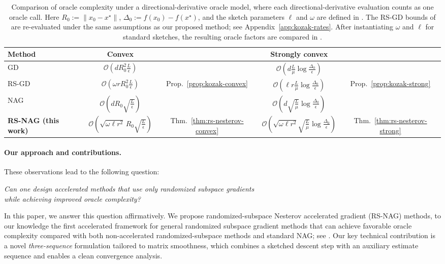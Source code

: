\documentclass[10pt]{article}
\begin{document}
 \begin{table}[t]
\centering
\caption{Comparison of oracle complexity under a directional-derivative oracle model, 
  where each directional-derivative evaluation counts as one oracle call. 
  Here \(R_0:=\|x_0-x^\star\|\), \(\Delta_0:=f(x_0)-f(x^\star)\), and the sketch parameters \(\ell\) and \(\omega\) are defined in . The RS-GD bounds of \cite{kozak2021} are re-evaluated under the same assumptions as our proposed method; see Appendix~\ref{app:kozak-rates}. After instantiating \(\omega\) and \(\ell\) for standard sketches, the resulting
oracle factors are compared in .}
\label{tab:oracle-comparison-intro}
{
\setlength{\tabcolsep}{4pt}
\renewcommand{\arraystretch}{1.1}
\begin{tabular}{@{}l|cc|cc@{}}
\toprule
Method & Convex & & Strongly convex & \\
\midrule
GD
&
\(\mathcal{O}\!\left(d R_0^2 \frac{L}{\epsilon}\right)\)
& 
&
\(\mathcal{O}\!\left(d \frac{L}{\mu}\log\frac{\Delta_0}{\epsilon}\right)\)
& 
\\
RS-GD \cite{kozak2021}
&
\(\mathcal{O}\!\left(\omega r R_0^2 \frac{L}{\epsilon}\right)\)
& Prop.~\ref{prop:kozak-convex}
&
\(\mathcal{O}\!\left(\ell r \frac{L}{\mu}\log\frac{\Delta_0}{\epsilon}\right)\)
& Prop.~\ref{prop:kozak-strong}
\\
\midrule
NAG \cite{nesterov1983,nesterov2004intro}
&
\(\mathcal{O}\!\left(d R_0 \sqrt{\frac{L}{\epsilon}}\right)\)
& 
&
\(\mathcal{O}\!\left(d \sqrt{\frac{L}{\mu}}\log\frac{\Delta_0}{\epsilon}\right)\)
& 
\\
\textbf{RS-NAG (this work)}
&
\(\mathcal{O}\!\left(\sqrt{\omega\ell r^2}\, R_0 \sqrt{\frac{L}{\epsilon}}\right)\)
& Thm.~\ref{thm:rs-nesterov-convex}
&
\(\mathcal{O}\!\left(\sqrt{\omega\ell r^2}\sqrt{\frac{L}{\mu}}\log\frac{\Delta_0}{\epsilon}\right)\)
& Thm.~\ref{thm:rs-nesterov-strong}
\\
\bottomrule
\end{tabular}
}
\end{table}




\paragraph{Our approach and contributions.}
These observations lead to the following question:
\begin{center}
  \emph{Can one design accelerated methods that use only randomized subspace gradients \\ while achieving improved oracle complexity?}
\end{center}
In this paper, we answer this question affirmatively.
We propose randomized-subspace Nesterov accelerated gradient (RS-NAG) methods,
to our knowledge the first accelerated framework for general randomized subspace gradient
methods that can achieve favorable oracle complexity compared with both
non-accelerated randomized-subspace methods and standard NAG; see
.
Our key technical contribution is a novel \emph{three-sequence} formulation tailored to
matrix smoothness, which combines a sketched descent step with an auxiliary estimate sequence
and enables a clean convergence analysis.
\end{document}
